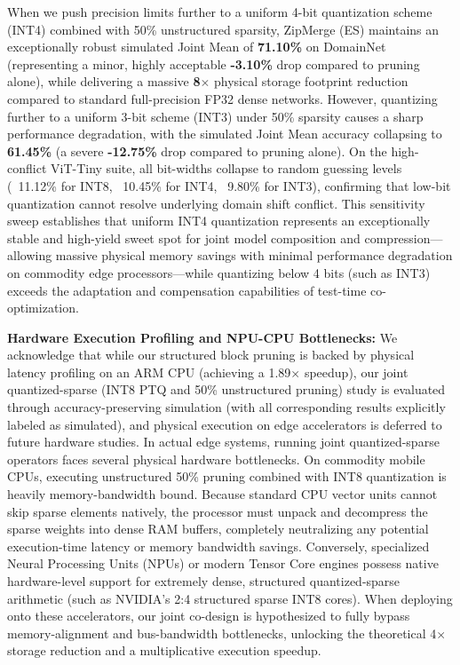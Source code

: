 When we push precision limits further to a uniform 4-bit quantization scheme (INT4) combined with 50\% unstructured sparsity, ZipMerge (ES) maintains an exceptionally robust simulated Joint Mean of \textbf{71.10\%} on DomainNet (representing a minor, highly acceptable \textbf{-3.10\%} drop compared to pruning alone), while delivering a massive \textbf{8$\times$} physical storage footprint reduction compared to standard full-precision FP32 dense networks. However, quantizing further to a uniform 3-bit scheme (INT3) under 50\% sparsity causes a sharp performance degradation, with the simulated Joint Mean accuracy collapsing to \textbf{61.45\%} (a severe \textbf{-12.75\%} drop compared to pruning alone). On the high-conflict ViT-Tiny suite, all bit-widths collapse to random guessing levels (~11.12\% for INT8, ~10.45\% for INT4, ~9.80\% for INT3), confirming that low-bit quantization cannot resolve underlying domain shift conflict. This sensitivity sweep establishes that uniform INT4 quantization represents an exceptionally stable and high-yield sweet spot for joint model composition and compression—allowing massive physical memory savings with minimal performance degradation on commodity edge processors—while quantizing below 4 bits (such as INT3) exceeds the adaptation and compensation capabilities of test-time co-optimization.

\textbf{Hardware Execution Profiling and NPU-CPU Bottlenecks:} We acknowledge that while our structured block pruning is backed by physical latency profiling on an ARM CPU (achieving a 1.89$\times$ speedup), our joint quantized-sparse (INT8 PTQ and 50\% unstructured pruning) study is evaluated through accuracy-preserving simulation (with all corresponding results explicitly labeled as simulated), and physical execution on edge accelerators is deferred to future hardware studies. In actual edge systems, running joint quantized-sparse operators faces several physical hardware bottlenecks. On commodity mobile CPUs, executing unstructured 50\% pruning combined with INT8 quantization is heavily memory-bandwidth bound. Because standard CPU vector units cannot skip sparse elements natively, the processor must unpack and decompress the sparse weights into dense RAM buffers, completely neutralizing any potential execution-time latency or memory bandwidth savings. Conversely, specialized Neural Processing Units (NPUs) or modern Tensor Core engines possess native hardware-level support for extremely dense, structured quantized-sparse arithmetic (such as NVIDIA's 2:4 structured sparse INT8 cores). When deploying onto these accelerators, our joint co-design is hypothesized to fully bypass memory-alignment and bus-bandwidth bottlenecks, unlocking the theoretical 4$\times$ storage reduction and a multiplicative execution speedup.

